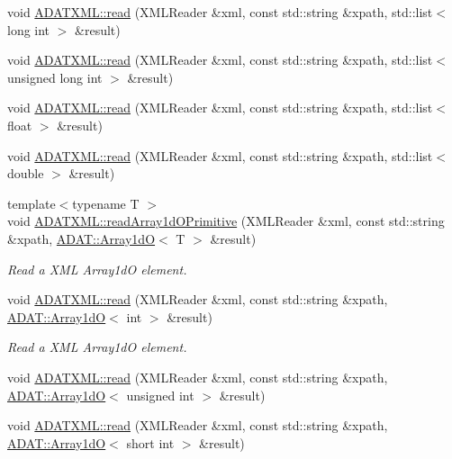 \begin{DoxyCompactItemize}
\item 
void \mbox{\hyperlink{group__io_ga3369838beeb12ff807171fc5978df1be}{A\+D\+A\+T\+X\+M\+L\+::read}} (X\+M\+L\+Reader \&xml, const std\+::string \&xpath, std\+::list$<$ long int $>$ \&result)
\item 
void \mbox{\hyperlink{group__io_gae359122dfdc08b4e41d5d8f230426192}{A\+D\+A\+T\+X\+M\+L\+::read}} (X\+M\+L\+Reader \&xml, const std\+::string \&xpath, std\+::list$<$ unsigned long int $>$ \&result)
\item 
void \mbox{\hyperlink{group__io_ga1a4d06e4f08869c717ad7db1a8fbfa2f}{A\+D\+A\+T\+X\+M\+L\+::read}} (X\+M\+L\+Reader \&xml, const std\+::string \&xpath, std\+::list$<$ float $>$ \&result)
\item 
void \mbox{\hyperlink{group__io_ga8feeff4a74f8b53707756dc206808983}{A\+D\+A\+T\+X\+M\+L\+::read}} (X\+M\+L\+Reader \&xml, const std\+::string \&xpath, std\+::list$<$ double $>$ \&result)
\item 
{\footnotesize template$<$typename T $>$ }\\void \mbox{\hyperlink{namespaceADATXML_a0a1d6e8dcbf52e1413441824f0aa44e9}{A\+D\+A\+T\+X\+M\+L\+::read\+Array1d\+O\+Primitive}} (X\+M\+L\+Reader \&xml, const std\+::string \&xpath, \mbox{\hyperlink{classADAT_1_1Array1dO}{A\+D\+A\+T\+::\+Array1dO}}$<$ T $>$ \&result)
\begin{DoxyCompactList}\small\item\em Read a X\+ML Array1dO element. \end{DoxyCompactList}\item 
void \mbox{\hyperlink{group__io_ga1f304041cae2cc81ec6bd79e94a0f7dd}{A\+D\+A\+T\+X\+M\+L\+::read}} (X\+M\+L\+Reader \&xml, const std\+::string \&xpath, \mbox{\hyperlink{classADAT_1_1Array1dO}{A\+D\+A\+T\+::\+Array1dO}}$<$ int $>$ \&result)
\begin{DoxyCompactList}\small\item\em Read a X\+ML Array1dO element. \end{DoxyCompactList}\item 
void \mbox{\hyperlink{group__io_ga1c554d7ca96ef05f2e5c8d92af1515b9}{A\+D\+A\+T\+X\+M\+L\+::read}} (X\+M\+L\+Reader \&xml, const std\+::string \&xpath, \mbox{\hyperlink{classADAT_1_1Array1dO}{A\+D\+A\+T\+::\+Array1dO}}$<$ unsigned int $>$ \&result)
\item 
void \mbox{\hyperlink{group__io_gaf12f0eb15652e228314c4a67e168688d}{A\+D\+A\+T\+X\+M\+L\+::read}} (X\+M\+L\+Reader \&xml, const std\+::string \&xpath, \mbox{\hyperlink{classADAT_1_1Array1dO}{A\+D\+A\+T\+::\+Array1dO}}$<$ short int $>$ \&result)

\end{DoxyCompactItemize}
